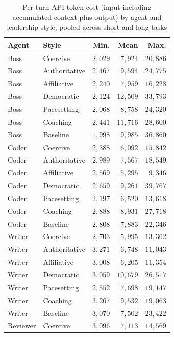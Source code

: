 \begin{table}[htbp]
  \centering
  \small
  \caption{Per-turn \ac{API} token cost (input including accumulated context plus output) by agent and leadership style, pooled across short and long tasks}
  \label{tab:03-tokens-per-message}
\begin{tabular}{l l r r r}
    \toprule
    Agent & Style & Min. & Mean & Max. \\
    \midrule
    Boss & Coercive & $2,029$ & $7,924$ & $20,886$ \\
    Boss & Authoritative & $2,467$ & $9,594$ & $24,775$ \\
    Boss & Affiliative & $2,240$ & $7,959$ & $16,228$ \\
    Boss & Democratic & $2,124$ & $12,509$ & $33,793$ \\
    Boss & Pacesetting & $2,068$ & $8,758$ & $24,320$ \\
    Boss & Coaching & $2,441$ & $11,716$ & $28,600$ \\
    Boss & Baseline & $1,998$ & $9,985$ & $36,860$ \\
    Coder & Coercive & $2,388$ & $6,092$ & $15,842$ \\
    Coder & Authoritative & $2,989$ & $7,567$ & $18,549$ \\
    Coder & Affiliative & $2,569$ & $5,295$ & $9,346$ \\
    Coder & Democratic & $2,659$ & $9,261$ & $39,767$ \\
    Coder & Pacesetting & $2,197$ & $6,520$ & $13,618$ \\
    Coder & Coaching & $2,888$ & $8,931$ & $27,718$ \\
    Coder & Baseline & $2,808$ & $7,883$ & $22,346$ \\
    Writer & Coercive & $2,703$ & $5,995$ & $13,362$ \\
    Writer & Authoritative & $3,271$ & $6,748$ & $11,043$ \\
    Writer & Affiliative & $3,008$ & $6,205$ & $11,354$ \\
    Writer & Democratic & $3,059$ & $10,679$ & $26,517$ \\
    Writer & Pacesetting & $2,552$ & $7,698$ & $19,147$ \\
    Writer & Coaching & $3,267$ & $9,532$ & $19,063$ \\
    Writer & Baseline & $3,070$ & $7,502$ & $23,422$ \\
    Reviewer & Coercive & $3,096$ & $7,113$ & $14,569$ \\

\end{tabular}
\end{table}
